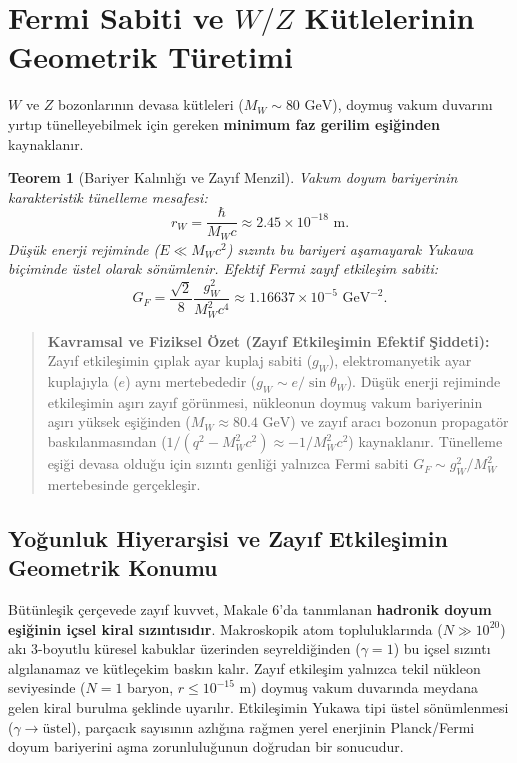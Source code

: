 \documentclass[11pt,a4paper]{article}
\newtheorem{theorem}{Teorem}[section]
\begin{document}
\section{Fermi Sabiti ve $W/Z$ Kütlelerinin Geometrik Türetimi}
\label{sec:fermi_turetilis}

$W$ ve $Z$ bozonlarının devasa kütleleri ($M_W \sim 80\text{ GeV}$), doymuş vakum duvarını yırtıp tünelleyebilmek için gereken \textbf{minimum faz gerilim eşiğinden} kaynaklanır.

\begin{theorem}[Bariyer Kalınlığı ve Zayıf Menzil]
    \label{thm:bariyer_ve_menzil_p4}
    Vakum doyum bariyerinin karakteristik tünelleme mesafesi:
    \begin{equation}
        r_W = \frac{\hbar}{M_W c} \approx 2.45 \times 10^{-18}\text{ m}.
        \label{eq:rw_tr}
    \end{equation}
    Düşük enerji rejiminde ($E \ll M_W c^2$) sızıntı bu bariyeri aşamayarak Yukawa biçiminde üstel olarak sönümlenir. Efektif Fermi zayıf etkileşim sabiti:
    \begin{equation}
        G_F = \frac{\sqrt{2}}{8} \frac{g_W^2}{M_W^2 c^4} \approx 1.16637 \times 10^{-5}\text{ GeV}^{-2}.
        \label{eq:fermi_ispat_tr}
    \end{equation}
\end{theorem}

\begin{quote}
    \small
    \textbf{Kavramsal ve Fiziksel Özet (Zayıf Etkileşimin Efektif Şiddeti):} \\
    Zayıf etkileşimin çıplak ayar kuplaj sabiti ($g_W$), elektromanyetik ayar kuplajıyla ($e$) aynı mertebededir ($g_W \sim e / \sin\theta_W$). Düşük enerji rejiminde etkileşimin aşırı zayıf görünmesi, nükleonun doymuş vakum bariyerinin aşırı yüksek eşiğinden ($M_W \approx 80.4\text{ GeV}$) ve zayıf aracı bozonun propagatör baskılanmasından ($1/(q^2 - M_W^2 c^2) \approx -1/M_W^2 c^2$) kaynaklanır. Tünelleme eşiği devasa olduğu için sızıntı genliği yalnızca Fermi sabiti $G_F \sim g_W^2 / M_W^2$ mertebesinde gerçekleşir.
\end{quote}

\subsection{Yoğunluk Hiyerarşisi ve Zayıf Etkileşimin Geometrik Konumu}
\label{sec:zayif_yogunluk_konumu}

Bütünleşik çerçevede zayıf kuvvet, Makale 6'da tanımlanan \textbf{hadronik doyum eşiğinin içsel kiral sızıntısıdır}.
Makroskopik atom topluluklarında ($N \gg 10^{20}$) akı 3-boyutlu küresel kabuklar üzerinden seyreldiğinden ($\gamma = 1$) bu içsel sızıntı algılanamaz ve kütleçekim baskın kalır. Zayıf etkileşim yalnızca tekil nükleon seviyesinde ($N=1$ baryon, $r \le 10^{-15}\text{ m}$) doymuş vakum duvarında meydana gelen kiral burulma şeklinde uyarılır. Etkileşimin Yukawa tipi üstel sönümlenmesi ($\gamma \to \text{üstel}$), parçacık sayısının azlığına rağmen yerel enerjinin Planck/Fermi doyum bariyerini aşma zorunluluğunun doğrudan bir sonucudur.
\end{document}
